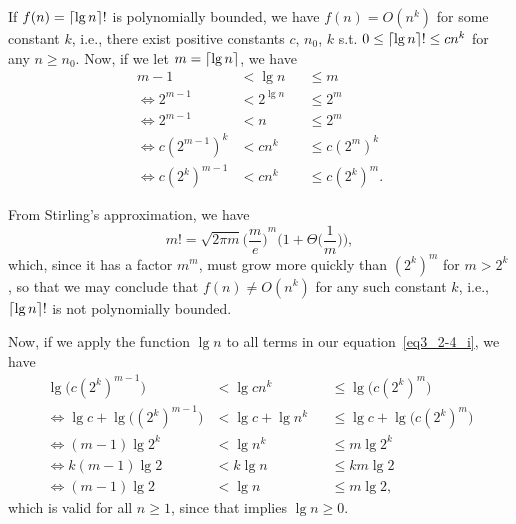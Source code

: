 If $f(n) = \lceil\lg{n}\rceil!$ is polynomially bounded, we have $f(n) = O(n^k)$ for some 
constant $k$, i.e., there exist positive constants $c$, $n_0$, $k$ s.t. 
$0 \leq \lceil\lg{n}\rceil! \leq cn^k$ for any $n \geq n_0$. Now, if we let $m = \lceil\lg{n}\rceil$,
we have
\begin{equation} \label{eq3_2-4_i}
    \begin{aligned}
        m - 1 &< \lg{n} &&\leq m \\
        \Leftrightarrow 2^{m - 1} &< 2^{\lg{n}} &&\leq 2^m \\
        \Leftrightarrow 2^{m - 1} &< n &&\leq 2^m \\
        \Leftrightarrow c{(2^{m - 1})}^k &< cn^k &&\leq c{(2^m)}^k \\
        \Leftrightarrow c{(2^k)}^{m - 1} &< cn^k &&\leq c{(2^k)}^m.
    \end{aligned}
\end{equation}

From Stirling's approximation, we have
\[
    m! = \sqrt{2\pi m} {\biggl(\frac{m}{e}\biggr)}^{m}
        \Biggl(1 + \Theta\Biggl(\frac{1}{m}\Biggr)\Biggr),
\]
which, since it has a factor $m^m$, must grow more quickly than ${(2^k)}^m$ for $m > 2^k$,
so that we may conclude that $f(n) \neq O(n^k)$ for any such constant $k$, i.e., 
$\lceil\lg{n}\rceil!$ is not polynomially bounded.

Now, if we apply the function $\lg{n}$ to all terms in our equation~\eqref{eq3_2-4_i},
we have
\begin{equation*}
    \begin{aligned}
        \lg{\biggl(c{(2^k)}^{m - 1}\biggr)} &< \lg{cn^k} 
            &&\leq \lg{\biggl(c{(2^k)}^m\biggr)} \\
        \Leftrightarrow \lg{c} + \lg{\biggl({(2^k)}^{m - 1}\biggr)} &< \lg{c} + \lg{n^k} 
            &&\leq \lg{c} + \lg{\biggl(c{(2^k)}^m\biggr)} \\
        \Leftrightarrow (m - 1)\lg{2^k} &< \lg{n^k} &&\leq m\lg{2^k} \\
        \Leftrightarrow k(m - 1)\lg{2} &< k\lg{n} &&\leq km\lg{2} \\
        \Leftrightarrow (m - 1)\lg{2} &< \lg{n} &&\leq m\lg{2},
    \end{aligned}
\end{equation*}
which is valid for all $n \geq 1$, since that implies $\lg{n} \geq 0$.
